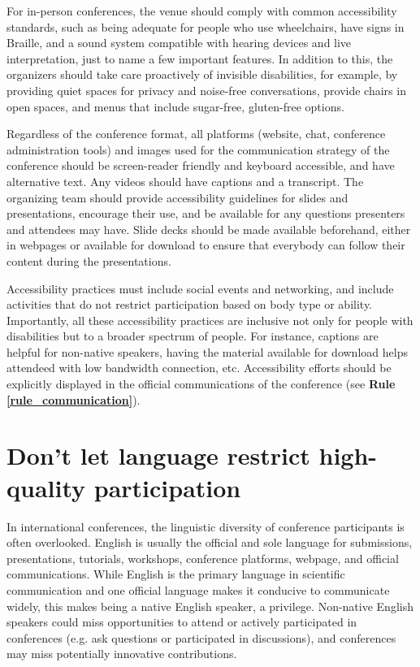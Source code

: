 \documentclass[10pt,letterpaper]{article}
\begin{document}
For in-person conferences, the venue should comply with common accessibility standards, such as being adequate for people who use wheelchairs, have signs in Braille, and a sound system compatible with hearing devices and live interpretation, just to name a few important features. In addition to this, the organizers should take care proactively of invisible disabilities, for example, by providing quiet spaces for privacy and noise-free conversations, provide chairs in open spaces, and menus that include sugar-free, gluten-free options.

Regardless of the conference format, all platforms (website, chat, conference administration tools) and images used for the communication strategy of the conference should be screen-reader friendly and keyboard accessible, and have alternative text. Any videos should have captions and a transcript. The organizing team should provide accessibility guidelines for slides and presentations, encourage their use, and be available for any questions presenters and attendees may have. Slide decks should be made available beforehand, either in webpages or available for download to ensure that everybody can follow their content during the presentations. 

Accessibility practices must include social events and networking, and include activities that do not restrict participation based on body type or ability. Importantly, all these accessibility practices are inclusive not only for people with disabilities but to a broader spectrum of people. For instance, captions are helpful for non-native speakers, having the material available for download helps attendeed with low bandwidth connection, etc. Accessibility efforts should be explicitly displayed in the official communications of the conference (see \textbf{Rule \ref{rule_communication}}). 




\section{Don't let language restrict high-quality participation}
\label{rule_language}

In international conferences, the linguistic diversity of conference participants is often overlooked. 
English is usually the official and sole language for submissions, presentations, tutorials, workshops, conference platforms, webpage, and official communications. 
While English is the primary language in scientific communication and one official language makes it conducive to communicate widely, this makes being a native English speaker, a privilege.
Non-native English speakers could miss opportunities to attend or actively participated in conferences (e.g. ask questions or participated in discussions),
and conferences may miss potentially innovative contributions.
\end{document}
